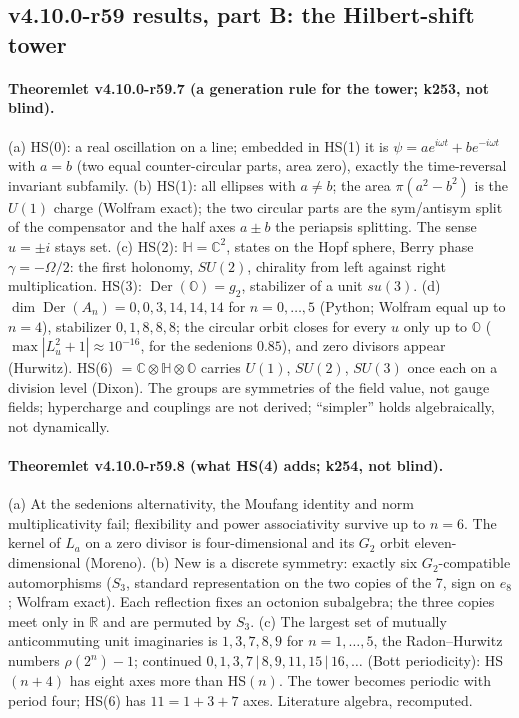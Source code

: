 \subsection*{v4.10.0-r59 results, part B: the Hilbert-shift tower}
\label{subsec:v4100-r59-results-b}

\paragraph{Theoremlet v4.10.0-r59.7 (a generation rule for the tower; k253, not blind).}
(a) HS(0): a real oscillation on a line; embedded in HS(1) it is \(\psi=ae^{i\omega t}+be^{-i\omega t}\) with \(a=b\) (two equal counter-circular parts,
area zero), exactly the time-reversal invariant subfamily.
(b) HS(1): all ellipses with \(a\neq b\); the area \(\pi(a^2-b^2)\) is the \(U(1)\) charge (Wolfram exact); the two circular parts are the sym/antisym
split of the compensator and the half axes \(a\pm b\) the periapsis splitting.  The sense \(u=\pm i\) stays set.
(c) HS(2): \(\mathbb H=\mathbb C^2\), states on the Hopf sphere, Berry phase \(\gamma=-\Omega/2\): the first holonomy, \(SU(2)\), chirality from left
against right multiplication.  HS(3): \(\operatorname{Der}(\mathbb O)=g_2\), stabilizer of a unit \(su(3)\).
(d) \(\dim\operatorname{Der}(A_n)=0,0,3,14,14,14\) for \(n=0,\dots,5\) (Python; Wolfram equal up to \(n=4\)), stabilizer \(0,1,8,8,8\); the circular orbit
closes for every \(u\) only up to \(\mathbb O\) (\(\max|L_u^2+1|\approx10^{-16}\), for the sedenions \(0.85\)), and zero divisors appear (Hurwitz).
HS(6) \(=\mathbb C\otimes\mathbb H\otimes\mathbb O\) carries \(U(1)\), \(SU(2)\), \(SU(3)\) once each on a division level (Dixon).
The groups are symmetries of the field value, not gauge fields; hypercharge and couplings are not derived; ``simpler'' holds algebraically,
not dynamically.

\paragraph{Theoremlet v4.10.0-r59.8 (what HS(4) adds; k254, not blind).}
(a) At the sedenions alternativity, the Moufang identity and norm multiplicativity fail; flexibility and power associativity survive up to
\(n=6\).  The kernel of \(L_a\) on a zero divisor is four-dimensional and its \(G_2\) orbit eleven-dimensional (Moreno).
(b) New is a discrete symmetry: exactly six \(G_2\)-compatible automorphisms (\(S_3\), standard representation on the two copies of the 7, sign on
\(e_8\); Wolfram exact).  Each reflection fixes an octonion subalgebra; the three copies meet only in \(\mathbb R\) and are permuted by \(S_3\).
(c) The largest set of mutually anticommuting unit imaginaries is \(1,3,7,8,9\) for \(n=1,\dots,5\), the Radon--Hurwitz numbers \(\rho(2^n)-1\);
continued \(0,1,3,7\,|\,8,9,11,15\,|\,16,\dots\) (Bott periodicity): HS\((n+4)\) has eight axes more than HS\((n)\).  The tower becomes periodic with
period four; HS(6) has \(11=1+3+7\) axes.  Literature algebra, recomputed.

